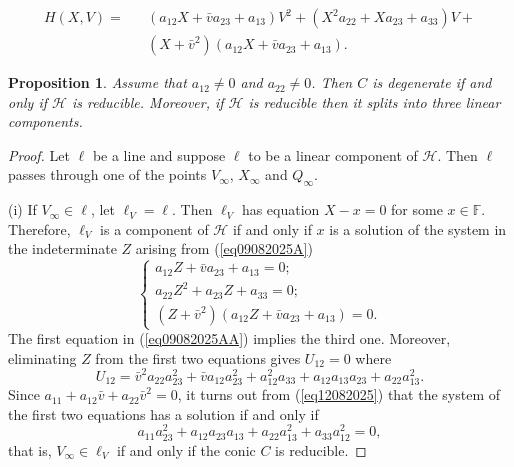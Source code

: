 \documentclass[10pt,a4paper]{amsart}
\newtheorem{proposition}{Proposition}
\begin{document}
\begin{equation}
\label{eq09082025A}
\begin{array}{llll}H(X,V)=&&(a_{12}X+\bar{v}a_{23}+a_{13})V^2+(X^2a_{22}+Xa_{23}+a_{33})V+\\
&& (X+\bar{v}^2)(a_{12}X+\bar{v}a_{23}+a_{13}).
\end{array}
\end{equation}

\begin{proposition}
\label{pro12082025} Assume that $a_{12}\ne 0$ and $a_{22}\ne 0$. Then $C$ is degenerate if and only if $\mathcal{H}$ is reducible. Moreover, if $\mathcal{H}$ is reducible then it splits into three linear components.
\end{proposition}

\begin{proof}
Let $\ell$ be a line and suppose $\ell$ to be a linear component of $\mathcal{H}$. Then $\ell$ passes through one of the points $V_\infty$, $X_\infty$ and $Q_\infty$.

(i)
If $V_\infty\in \ell$, let $\ell_V=\ell$. Then $\ell_V$ has equation $X-x=0$ for some $x\in \mathbb{F}$. Therefore, $\ell_V$ is a component of $\mathcal{H}$ if and only if $x$ is a solution of the system in the indeterminate $Z$ arising from (\ref{eq09082025A})
\begin{equation}
\label{eq09082025AA}
\begin{cases}
a_{12}Z+\bar{v}a_{23}+a_{13}=0;\\
a_{22}Z^2+a_{23}Z+a_{33}=0;\\
(Z+\bar{v}^2)(a_{12}Z+\bar{v}a_{23}+a_{13})=0.
\end{cases}
\end{equation}
 The first equation in (\ref{eq09082025AA}) implies the third one.
 Moreover, eliminating $Z$ from the first two equations gives $U_{12}=0$ where
\begin{equation}
\label{eq12082025}
U_{12}=\bar{v}^2a_{22}a_{23}^2+\bar{v}a_{12}a_{23}^2+a_{12}^2a_{33}+a_{12}a_{13}a_{23}+a_{22}a_{13}^2.
\end{equation}
Since $a_{11}+a_{12}\bar{v}+a_{22}\bar{v}^2=0$, it turns out from (\ref{eq12082025}) that the system of the first two equations has a solution if and only if
$$a_{11}a_{23}^2+a_{12}a_{23}a_{13}+a_{22}a_{13}^2+a_{33}a_{12}^2=0,$$
that is, $V_\infty\in \ell_V$ if and only if the conic $C$ is reducible.


\end{proof}
\end{document}
